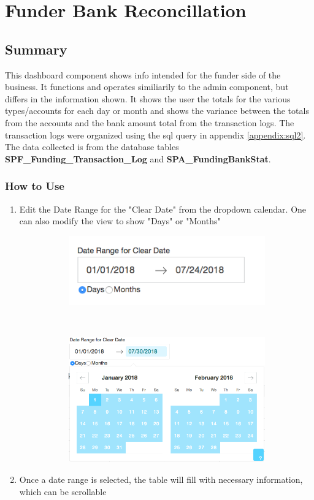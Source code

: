 \documentclass[titlepage]{article}
\begin{document}
\section{Funder Bank Reconcillation}
\subsection{Summary}
This dashboard component shows info intended for the funder side of the business. It functions and operates similiarily to the admin component, but differs in the information shown. It shows the user the totals for the various types/accounts for each day or month and shows the variance between the totals from the accounts and the bank amount total from the transaction logs. The transaction logs were organized using the sql query in appendix \ref{appendix:sql2}. The data collected is from the database tables \textbf{SPF\_Funding\_Transaction\_Log} and \textbf{SPA\_FundingBankStat}.

\subsubsection{How to Use}
\begin{enumerate}
	\item Edit the Date Range for the "Clear Date" from the dropdown calendar. One can also modify the view to show "Days" or "Months"
	\begin{figure}[h]
		\begin{subfigure}[b]{.5\textwidth}
			\includegraphics[scale=.5]{./pics/bank_reconcillation_dateRange.png}
		\end{subfigure}
		~
		\begin{subfigure}[b]{0.5\textwidth}
			\includegraphics[scale=.3]{./pics/bank_reconcillation_dateRange_dropdown.png}
		\end{subfigure}
	\end{figure}
	\item Once a date range is selected, the table will fill with necessary information, which can be scrollable
\end{enumerate} 
\end{document}
